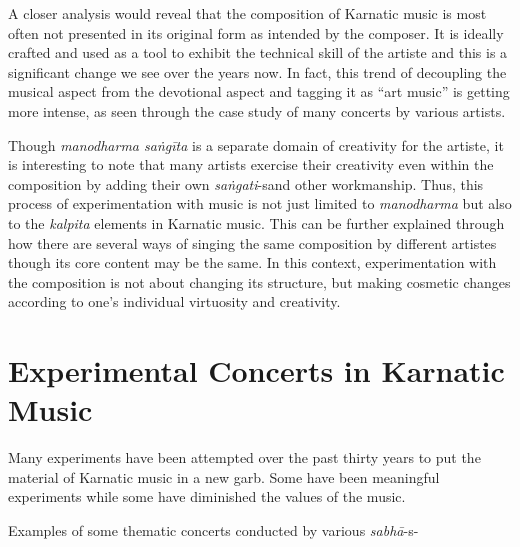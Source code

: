 A closer analysis would reveal that the composition of Karnatic music is most often not presented in its original form as intended by the composer. It is ideally crafted and used as a tool to exhibit the technical skill of the artiste and this is a significant change we see over the years now. In fact, this trend of decoupling the musical aspect from the devotional aspect and tagging it as “art music” is getting more intense, as seen through the case study of many concerts by various artists.

Though \textit{manodharma saṅgīta} is a separate domain of creativity for the artiste, it is interesting to note that many artists exercise their creativity even within the composition by adding their own \textit{saṅgati}-s\break and other workmanship. Thus, this process of experimentation with music is not just limited to \textit{manodharma} but also to the \textit{kalpita} elements in Karnatic music. This can be further explained through how there are several ways of singing the same composition by different artistes though its core content may be the same. In this context, experimentation with the composition is not about changing its structure, but making cosmetic changes according to one’s individual virtuosity and creativity.


\section*{Experimental Concerts in Karnatic Music}

Many experiments have been attempted over the past thirty years to put the material of Karnatic music in a new garb. Some have been meaningful experiments while some have diminished the values of the music.

Examples of some thematic concerts conducted by various \textit{sabhā}-s-

